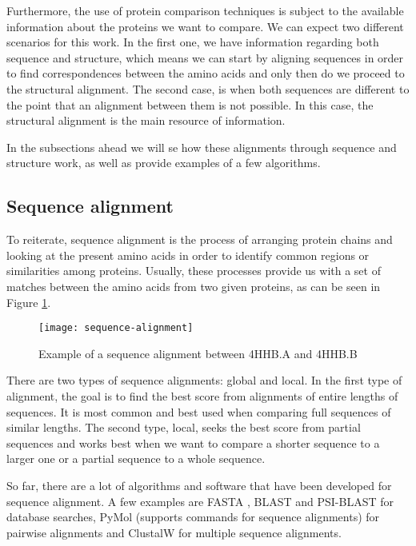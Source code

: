 Furthermore, the use of protein comparison techniques is subject to the available information about the proteins we want to compare. We can expect two different scenarios for this work. In the first one, we have information regarding both sequence and structure, which means we can start by aligning sequences in order to find correspondences between the amino acids and only then do we proceed to the structural alignment. The second case, is when both sequences are different to the point that an alignment between them is not possible. In this case, the structural alignment is the main resource of information.

In the subsections ahead we will se how these alignments through sequence and structure work, as well as provide examples of a few algorithms.

\subsection{Sequence alignment}

To reiterate, sequence alignment is the process of arranging protein chains and looking at the present amino acids in order to identify common regions or similarities among proteins. Usually, these processes provide us with a set of matches between the amino acids from two given proteins, as can be seen in Figure \ref{fig:sequencealignment}. 

\begin{figure}[htbp]
	\centering
	\texttt{[image: sequence-alignment]}
	\caption{Example of a sequence alignment between 4HHB.A and 4HHB.B}
	\label{fig:sequencealignment}
\end{figure}

There are two types of sequence alignments: global and local. In the first type of alignment, the goal is to find the best score from alignments of entire lengths of sequences. It is most common and best used when comparing full sequences of similar lengths. The second type, local, seeks the best score from partial sequences and works best when we want to compare a shorter sequence to a larger one or a partial sequence to a whole sequence.

So far, there are a lot of algorithms and software that have been developed for sequence alignment. A few examples are FASTA \cite{lipman1985rapid}, BLAST \cite{altschul1990basic} and PSI-BLAST \cite{altschul1997gapped} for database searches, PyMol \cite{delano2002pymol} (supports commands for sequence alignments) for pairwise alignments and ClustalW \cite{chenna2003multiple} for multiple sequence alignments.

